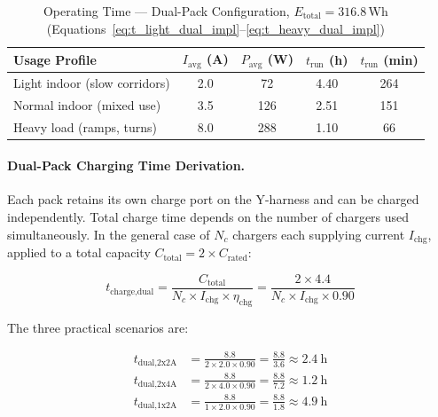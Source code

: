 \documentclass[12pt,a4paper]{report}
\begin{document}
\begin{table}[H]
\centering
\caption{Operating Time — Dual-Pack Configuration, $E_\text{total} =
  316.8$\,Wh
  (Equations~\eqref{eq:t_light_dual_impl}--\eqref{eq:t_heavy_dual_impl})}
\label{tab:runtime_dual_impl}
\begin{tabular}{@{}p{4.0cm} S[table-format=1.1]
                S[table-format=3.0] S[table-format=1.2]
                S[table-format=3.0]@{}}
\toprule
{}
\textbf{Usage Profile}
  & {$I_\text{avg}$ (A)}
  & {$P_\text{avg}$ (W)}
  & {$t_\text{run}$ (h)}
  & {$t_\text{run}$ (min)} \\
\midrule
Light indoor (slow corridors) & 2.0 &  72 & 4.40 & 264 \\
Normal indoor (mixed use)     & 3.5 & 126 & 2.51 & 151 \\
Heavy load (ramps, turns)     & 8.0 & 288 & 1.10 &  66 \\
\bottomrule
\end{tabular}
\end{table}

\paragraph{Dual-Pack Charging Time Derivation.}

Each pack retains its own charge port on the Y-harness and can be
charged independently. Total charge time depends on the number of
chargers used simultaneously. In the general case of $N_c$ chargers
each supplying current $I_\text{chg}$, applied to a total capacity
$C_\text{total} = 2 \times C_\text{rated}$:

\begin{equation}
  t_\text{charge,dual} =
  \frac{C_\text{total}}{N_c \times I_\text{chg} \times \eta_\text{chg}}
  = \frac{2 \times 4.4}{N_c \times I_\text{chg} \times 0.90}
  \label{eq:charge_dual_gen_impl}
\end{equation}

The three practical scenarios are:

\begin{align}
  t_{\text{dual,2x2A}} &=
    \frac{8.8}{2 \times 2.0 \times 0.90}
    = \frac{8.8}{3.6} \approx \SI{2.4}{\hour}
  \label{eq:charge_2x2A_impl} \\[4pt]
  t_{\text{dual,2x4A}} &=
    \frac{8.8}{2 \times 4.0 \times 0.90}
    = \frac{8.8}{7.2} \approx \SI{1.2}{\hour}
  \label{eq:charge_2x4A_impl} \\[4pt]
  t_{\text{dual,1x2A}} &=
    \frac{8.8}{1 \times 2.0 \times 0.90}
    = \frac{8.8}{1.8} \approx \SI{4.9}{\hour}
  \label{eq:charge_1x2A_impl}
\end{align}
\end{document}
